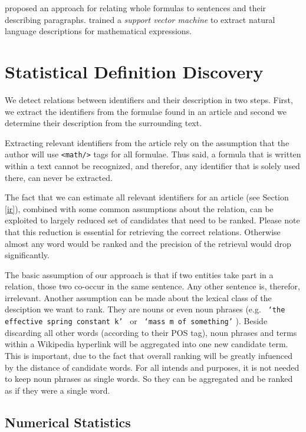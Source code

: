 \documentclass[runningheads]{llncs}
\begin{document}
\citeauthor{Quoc2010} \cite{Quoc2010} proposed an approach for
relating whole formulas to sentences and their describing paragraphs.
\citeauthor{Yokoi} \cite{Yokoi} trained a \emph{support vector machine} to extract
natural language descriptions for mathematical expressions.


\section{Statistical Definition Discovery}

We detect relations between identifiers and their description in two steps.
First, we extract the identifiers from the formulae found in an article and
second we determine their description from the surrounding text.

Extracting relevant identifiers from the article rely on the assumption that
the author will use \texttt{<math/>} tags for all formulae. Thus said, a
formula that is written within a text cannot be recognized, and therefor, any
identifier that is solely used there, can never be extracted.


The fact that we can estimate all relevant identifiers for an article (see
Section \ref{ir}), combined with some common assumptions about the relation,
can be exploited to largely reduced set of candidates that need to be ranked.
Please note that this reduction is essential for retrieving the correct
relations. Otherwise almost any word would be ranked and the precision of the
retrieval would drop significantly.

The basic assumption of our approach is that if two entities take part in a
relation, those two co-occur in the same sentence. Any other sentence is,
therefor, irrelevant. Another assumption can be made about the lexical class
of the desciption we want to rank. They are nouns or even noun phrases (e.g.
\texttt{ `the effective spring constant k' } or \texttt{ `mass m of
something'} ). Beside discarding all other words (according to their POS tag),
noun phrases and terms within a Wikipedia hyperlink will be aggregated into
one new candidate term. This is important, due to the fact that overall
ranking will be greatly infuenced by the distance of candidate words. For all
intends and purposes, it is not needed to keep noun phrases as single words.
So they can be aggregated and be ranked as if they were a single word.


\subsection{Numerical Statistics}
\end{document}
